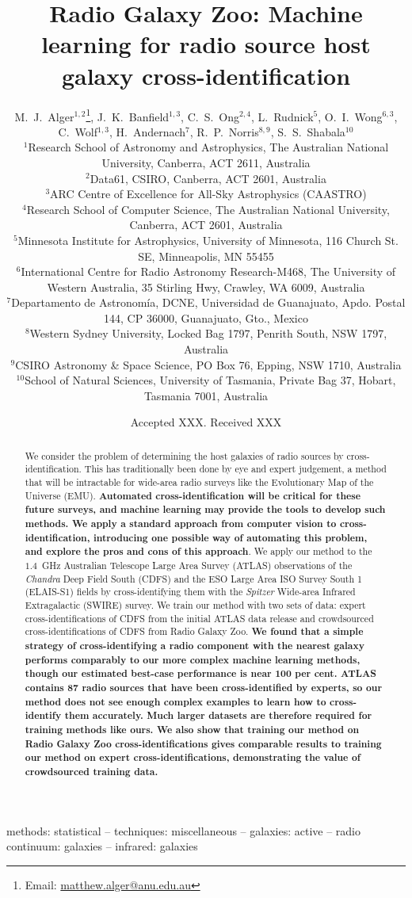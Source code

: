 \documentclass[fleqn,usenatbib,usedcolumn]{mnras}
\title[Machine learning for radio cross-identification]{Radio Galaxy Zoo: Machine learning for radio source host galaxy cross-identification}
\author[Alger et al.]{M.~J.~Alger$^{1, 2}$\thanks{Email: \href{mailto:matthew.alger@anu.edu.au}{matthew.alger@anu.edu.au}},
  J.~K.~Banfield$^{1, 3}$,
  C.~S.~Ong$^{2, 4}$,
  L.~Rudnick$^{5}$,
  O.~I.~Wong$^{6, 3}$,
  C.~Wolf$^{1, 3}$,
  \newauthor
  H.~Andernach$^{7}$,
  R.~P.~Norris$^{8, 9}$,
  S.~S.~Shabala$^{10}$
\\
$^{1}$Research School of Astronomy and Astrophysics, The Australian National University, Canberra, ACT 2611, Australia\\
$^{2}$Data61, CSIRO, Canberra, ACT 2601, Australia\\
$^{3}$ARC Centre of Excellence for All-Sky Astrophysics (CAASTRO)\\
$^{4}$Research School of Computer Science, The Australian National University, Canberra, ACT 2601, Australia\\
$^{5}$Minnesota Institute for Astrophysics, University of Minnesota, 116 Church St. SE, Minneapolis, MN 55455\\
$^{6}$International Centre for Radio Astronomy Research-M468, The University of Western Australia, 35 Stirling Hwy, Crawley, WA 6009, Australia\\
$^{7}$Departamento de Astronom\'ia, DCNE, Universidad de Guanajuato, Apdo. Postal 144, CP 36000, Guanajuato, Gto., Mexico\\
$^{8}$Western Sydney University, Locked Bag 1797, Penrith South, NSW 1797, Australia\\
$^{9}$CSIRO Astronomy \& Space Science, PO Box 76, Epping, NSW 1710, Australia\\
$^{10}$School of Natural Sciences, University of Tasmania, Private Bag 37, Hobart, Tasmania 7001, Australia
}
\date{Accepted XXX. Received XXX}
\newcommand{\edited}[1]{{\bf {#1}}}
\begin{document}
\label{firstpage}
\pagerange{\pageref{firstpage}--\pageref{lastpage}}
\maketitle

\begin{abstract}
  We consider the problem of determining the host galaxies of radio sources by
  cross-identification. This has traditionally been done by eye and expert
  judgement, a method that will be intractable for wide-area radio surveys
  like the Evolutionary Map of the Universe (EMU). \edited{Automated
  cross-identification will be critical for these future surveys, and machine
  learning may provide the tools to develop such methods. We apply a standard
  approach from computer vision to cross-identification, introducing one
  possible way of automating this problem, and explore the pros and cons of
  this approach}. We apply our method to the $1.4$~GHz Australian Telescope
  Large Area Survey (ATLAS) observations of the \emph{Chandra} Deep Field
  South (CDFS) and the ESO Large Area ISO Survey South 1 (ELAIS-S1) fields by
  cross-identifying them with the \emph{Spitzer} Wide-area Infrared
  Extragalactic (SWIRE) survey. We train our method with two sets of
  data: expert cross-identifications of CDFS from the initial ATLAS data
  release and crowdsourced cross-identifications of CDFS from Radio Galaxy
  Zoo. \edited{We found that a simple strategy of cross-identifying a radio component
  with the nearest galaxy performs comparably to our more complex machine learning methods, though our estimated best-case performance is near 100 per cent.
  ATLAS contains 87 radio sources that have been cross-identified by experts,
  so our method does not see enough
  complex examples to learn how to cross-identify them accurately. Much larger
  datasets are therefore required for training methods like ours. We also show
  that training our method on Radio Galaxy Zoo cross-identifications gives
  comparable results to training our method on expert cross-identifications,
  demonstrating the value of crowdsourced training data.}
\end{abstract}

\begin{keywords}
methods: statistical -- techniques: miscellaneous -- galaxies: active -- radio continuum: galaxies -- infrared: galaxies\\
\end{keywords}
\end{document}
